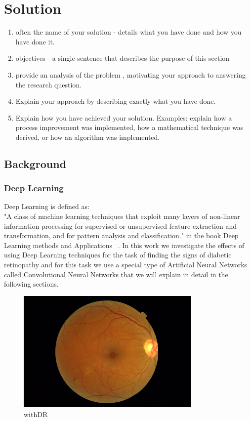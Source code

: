 \chapter{Solution}
\begin{enumerate}
    \item often the name of your solution - details what you have done and how you have done it.
    \item objectives - a single sentence that describes the purpose of this section
    \item provide an analysis of the problem , motivating your approach to answering the research question.
    \item Explain your approach by describing exactly what you have done.
    \item Explain how you have achieved your solution. Examples: explain how a process improvement was implemented, how a mathematical technique was derived, or how an algorithm was implemented.
\end{enumerate}

\section{Background}
\subsection{Deep Learning}
Deep Learning is defined as:\\
"A class of machine learning techniques that exploit many layers of non-linear information processing for supervised or unsupervised feature extraction and transformation, and for pattern analysis and classification." in the book Deep Learning methods and Applications ~\cite{deng2014deep}. In this work we investigate the effects of using Deep Learning techniques for the task of finding the signs of diabetic retinopathy and for this task we use a special type of Artificial Neural Networks called Convolutional Neural Networks that we will explain in detail in the following sections.   

\begin{figure}[t]
\caption{withDR}
\label{figDR}
\centering
\includegraphics[width=0.8\textwidth]{Figures/DR}
\end{figure}

